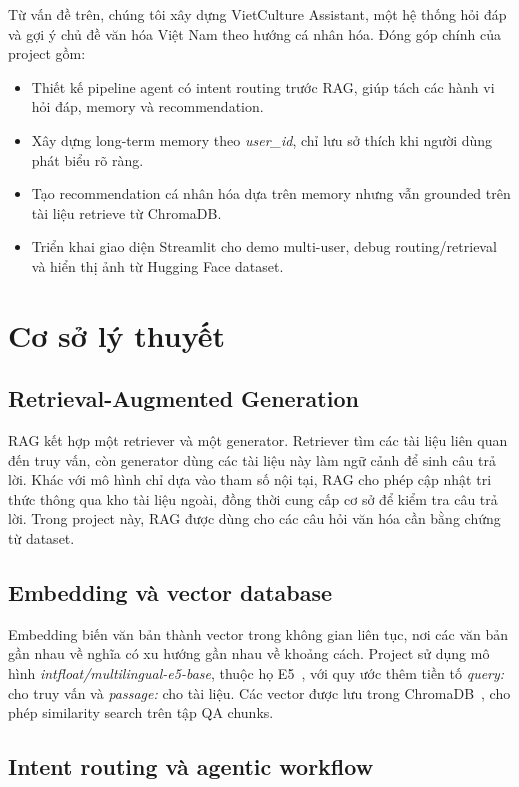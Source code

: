 \documentclass[11pt]{article}
\begin{document}
Từ vấn đề trên, chúng tôi xây dựng VietCulture Assistant, một hệ thống hỏi đáp và gợi ý chủ đề văn hóa Việt Nam theo hướng cá nhân hóa. Đóng góp chính của project gồm:
\begin{itemize}[leftmargin=*, itemsep=1pt]
    \item Thiết kế pipeline agent có intent routing trước RAG, giúp tách các hành vi hỏi đáp, memory và recommendation.
    \item Xây dựng long-term memory theo \textit{user\_id}, chỉ lưu sở thích khi người dùng phát biểu rõ ràng.
    \item Tạo recommendation cá nhân hóa dựa trên memory nhưng vẫn grounded trên tài liệu retrieve từ ChromaDB.
    \item Triển khai giao diện Streamlit cho demo multi-user, debug routing/retrieval và hiển thị ảnh từ Hugging Face dataset.
\end{itemize}

\section{Cơ sở lý thuyết}

\subsection{Retrieval-Augmented Generation}

RAG kết hợp một retriever và một generator. Retriever tìm các tài liệu liên quan đến truy vấn, còn generator dùng các tài liệu này làm ngữ cảnh để sinh câu trả lời. Khác với mô hình chỉ dựa vào tham số nội tại, RAG cho phép cập nhật tri thức thông qua kho tài liệu ngoài, đồng thời cung cấp cơ sở để kiểm tra câu trả lời. Trong project này, RAG được dùng cho các câu hỏi văn hóa cần bằng chứng từ dataset.

\subsection{Embedding và vector database}

Embedding biến văn bản thành vector trong không gian liên tục, nơi các văn bản gần nhau về nghĩa có xu hướng gần nhau về khoảng cách. Project sử dụng mô hình \textit{intfloat/multilingual-e5-base}, thuộc họ E5~\citep{wang2022text}, với quy ước thêm tiền tố \textit{query:} cho truy vấn và \textit{passage:} cho tài liệu. Các vector được lưu trong ChromaDB~\citep{chroma}, cho phép similarity search trên tập QA chunks.

\subsection{Intent routing và agentic workflow}
\end{document}
